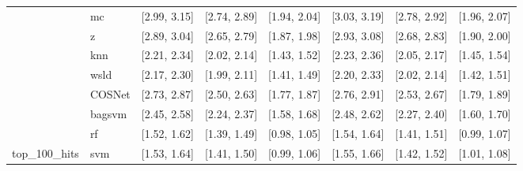 \begin{table}[H]
{\begin{tabular}{llllllll}
 & mc & [2.99, 3.15] & [2.74, 2.89] & [1.94, 2.04] & [3.03, 3.19] & [2.78, 2.92] & [1.96, 2.07]\\

 & z & [2.89, 3.04] & [2.65, 2.79] & [1.87, 1.98] & [2.93, 3.08] & [2.68, 2.83] & [1.90, 2.00]\\

 & knn & [2.21, 2.34] & [2.02, 2.14] & [1.43, 1.52] & [2.23, 2.36] & [2.05, 2.17] & [1.45, 1.54]\\

 & wsld & [2.17, 2.30] & [1.99, 2.11] & [1.41, 1.49] & [2.20, 2.33] & [2.02, 2.14] & [1.42, 1.51]\\

 & COSNet & [2.73, 2.87] & [2.50, 2.63] & [1.77, 1.87] & [2.76, 2.91] & [2.53, 2.67] & [1.79, 1.89]\\

 & bagsvm & [2.45, 2.58] & [2.24, 2.37] & [1.58, 1.68] & [2.48, 2.62] & [2.27, 2.40] & [1.60, 1.70]\\

 & rf & [1.52, 1.62] & [1.39, 1.49] & [0.98, 1.05] & [1.54, 1.64] & [1.41, 1.51] & [0.99, 1.07]\\

\multirow{-15}{*}{\raggedright\arraybackslash top\_100\_hits} & svm & [1.53, 1.64] & [1.41, 1.50] & [0.99, 1.06] & [1.55, 1.66] & [1.42, 1.52] & [1.01, 1.08]\\
\bottomrule
\end{tabular}}
\end{table}
